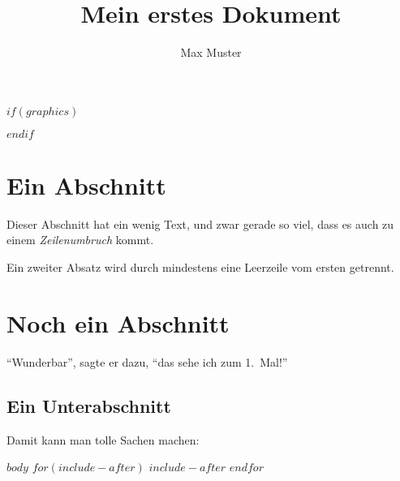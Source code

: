 




$if(graphics)$

\makeatletter
\def\maxwidth{\ifdim\Gin@nat@width>\linewidth\linewidth
\else\Gin@nat@width\fi}
\makeatother
\let\Oldincludegraphics\includegraphics
\renewcommand{\includegraphics}[1]{\Oldincludegraphics[width=\maxwidth]{#1}}
$endif$

\VerbatimFootnotes

\setlength{\parindent}{0pt}
\setlength{\parskip}{6pt plus 2pt minus 1pt}
\setlength{\emergencystretch}{3em}  %
\providecommand{\tightlist}{%
  \setlength{\itemsep}{0pt}\setlength{\parskip}{0pt}}
\setcounter{secnumdepth}{0}
\VerbatimFootnotes %


\author{Max Muster}
\title{Mein erstes Dokument}
\maketitle
\tableofcontents

\section{Ein Abschnitt}
Dieser Abschnitt hat ein wenig Text, und zwar gerade so viel, dass
es auch zu einem \emph{Zeilenumbruch} kommt. 

Ein zweiter Absatz wird durch mindestens eine Leerzeile vom ersten
getrennt.

\section{Noch ein Abschnitt}
"`Wunderbar"', sagte er dazu, "`das sehe ich zum 1.~Mal!"'

\subsection{Ein Unterabschnitt}
Damit kann man tolle Sachen machen:

$body$
$for(include-after)$
  $include-after$
$endfor$

